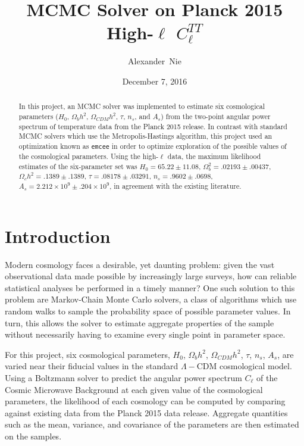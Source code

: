 \documentclass[aps,prd,final,twocolumn]{revtex4}
\begin{document}
\title{MCMC Solver on Planck 2015 High-$\ell$ $C_{\ell}^{TT}$}
\author{Alexander~Nie}
\date{December 7, 2016} 

\begin{abstract}
\noindent	
In this project, an MCMC solver was implemented to estimate six cosmological parameters ($H_0$, $\Omega_b h^2$, $\Omega_{CDM} h^2$, $\tau$, $n_s$, and $A_s$) from the two-point angular power spectrum of temperature data from the Planck 2015 release. In contrast with standard MCMC solvers which use the Metropolis-Hastings algorithm, this project used an optimization known as \texttt{emcee} in order to optimize exploration of the possible values of the cosmological parameters. Using the high-$\ell$ data, the maximum likelihood estimates of the six-parameter set was $H_0 = 65.22\pm 11.08$, $\Omega_b^2 = .02193\pm .00437$, $\Omega_ch^2 = .1389\pm .1389$, $\tau = .08178\pm .03291$, $n_s = .9602\pm .0698$, $A_s = 2.212\times 10^9\pm .204\times 10^9$, in agreement with the existing literature.
 \end{abstract}

\maketitle

\pagestyle{myheadings}
\thispagestyle{empty}


\section{Introduction}
\indent Modern cosmology faces a desirable, yet daunting problem: given the vast observational data made possible by increasingly large surveys, how can reliable statistical analyses be performed in a timely manner? One such solution to this problem are Markov-Chain Monte Carlo solvers, a class of algorithms which use random walks to sample the probability space of possible parameter values. In turn, this allows the solver to estimate aggregate properties of the sample without necessarily having to examine every single point in parameter space.

\indent For this project, six cosmological parameters, $H_0$, $\Omega_b h^2$, $\Omega_{CDM} h^2$, $\tau$, $n_s$, $A_s$, are varied near their fiducial values in the standard $\Lambda-$CDM cosmological model. Using a Boltzmann solver to predict the angular power spectrum $C_{\ell}$ of the Cosmic Microwave Background at each given value of the cosmological parameters, the likelihood of each cosmology can be computed by comparing against existing data from the Planck 2015 data release. Aggregate quantities such as the mean, variance, and covariance of the parameters are then estimated on the samples.
\end{document}
